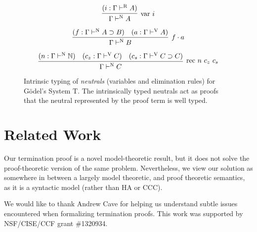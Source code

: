 \documentclass[preprint,nonatbib]{sigplanconf}
\numberwithin{mysubdfn}{mydfn}
\def\arr{\supset}
\def\app{\cdot}
\def\nat{\mathbb{N}}
\newcommand{\turn}[1]{\vdash^\con{#1}}
\newcommand{\con}[1]{\textmd{#1}}
\newcommand{\fun}[1]{\textmd{#1}}
\newcommand{\typv}[1]{\Gamma \turn{V} #1}
\newcommand{\typn}[1]{\Gamma \turn{N} #1}
\newcommand{\typr}[1]{\Gamma \turn{R} #1}
\begin{document}
\begin{figure}
\caption{
Intrinsic typing of {\it neutrals} (variables and elimination rules) 
for G{\"o}del's System T.
The intrinsically typed neutrals act as proofs that the neutral
represented by the proof term is well typed.
}

$$
\infer
  [\fun{var} ~ i]
  {\typn{A}}
{
  (i : \typr{A})
}
$$

$$
\infer
  [f \app a]
  {\typn{B}}
{
  (f : \typn{A \arr B})
  &
  (a : \typv{A})
}
$$

$$
\infer
  [\fun{rec} ~ n ~ c_z ~ c_s]
  {\typn{C}}
{
  (n : \typn{\nat})
  &
  (c_z : \typv{C})
  &
  (c_s : \typv{C \arr C})
}
$$
\label{fig:typn}
\end{figure}


\section{Related Work}

Our termination proof is a novel model-theoretic result, but it
does not solve the proof-theoretic version of the same problem.
Nevertheless, we view our solution as somewhere in between a largely
model theoretic, and proof theoretic semantics, as it is a syntactic
model (rather than HA or CCC).


\acks

We would like to thank Andrew Cave for helping us understand subtle
issues encountered when formalizing termination proofs.
This work was supported by NSF/CISE/CCF grant \#1320934.



\end{document}
